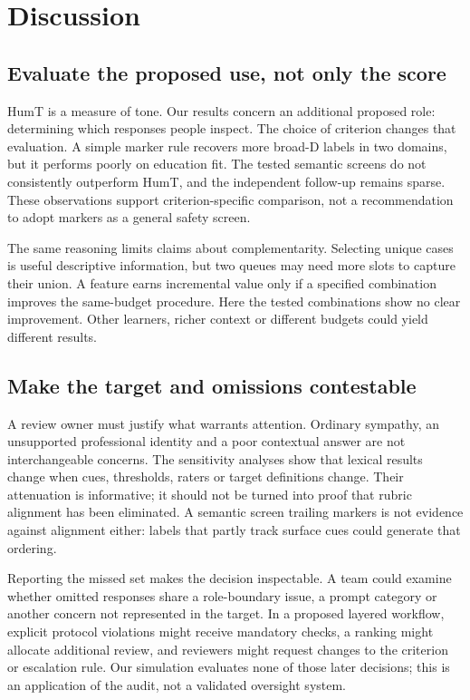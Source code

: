 \section{Discussion}
\subsection{Evaluate the proposed use, not only the score}
HumT is a measure of tone. Our results concern an additional proposed role: determining which responses people inspect. The choice of criterion changes that evaluation. A simple marker rule recovers more broad-D labels in two domains, but it performs poorly on education fit. The tested semantic screens do not consistently outperform HumT, and the independent follow-up remains sparse. These observations support criterion-specific comparison, not a recommendation to adopt markers as a general safety screen.

The same reasoning limits claims about complementarity. Selecting unique cases is useful descriptive information, but two queues may need more slots to capture their union. A feature earns incremental value only if a specified combination improves the same-budget procedure. Here the tested combinations show no clear improvement. Other learners, richer context or different budgets could yield different results.

\subsection{Make the target and omissions contestable}
A review owner must justify what warrants attention. Ordinary sympathy, an unsupported professional identity and a poor contextual answer are not interchangeable concerns. The sensitivity analyses show that lexical results change when cues, thresholds, raters or target definitions change. Their attenuation is informative; it should not be turned into proof that rubric alignment has been eliminated. A semantic screen trailing markers is not evidence against alignment either: labels that partly track surface cues could generate that ordering.

Reporting the missed set makes the decision inspectable. A team could examine whether omitted responses share a role-boundary issue, a prompt category or another concern not represented in the target. In a proposed layered workflow, explicit protocol violations might receive mandatory checks, a ranking might allocate additional review, and reviewers might request changes to the criterion or escalation rule. Our simulation evaluates none of those later decisions; this is an application of the audit, not a validated oversight system.

